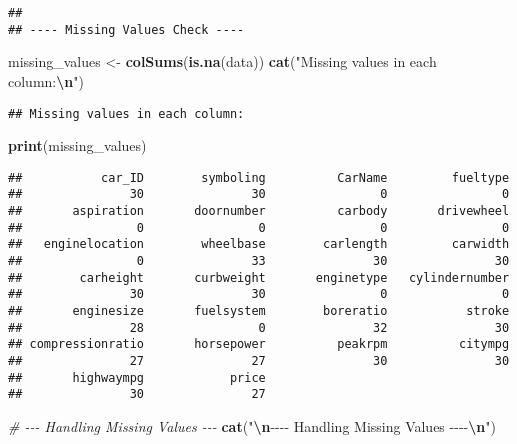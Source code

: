\documentclass[
]{article}
\newenvironment{Shaded}{\begin{snugshade}}{\end{snugshade}}
\newcommand{\CommentTok}[1]{\textcolor[rgb]{0.56,0.35,0.01}{\textit{#1}}}
\newcommand{\FunctionTok}[1]{\textcolor[rgb]{0.13,0.29,0.53}{\textbf{#1}}}
\newcommand{\NormalTok}[1]{#1}
\newcommand{\OtherTok}[1]{\textcolor[rgb]{0.56,0.35,0.01}{#1}}
\newcommand{\SpecialCharTok}[1]{\textcolor[rgb]{0.81,0.36,0.00}{\textbf{#1}}}
\newcommand{\StringTok}[1]{\textcolor[rgb]{0.31,0.60,0.02}{#1}}
\begin{document}
\begin{verbatim}
## 
## ---- Missing Values Check ----
\end{verbatim}

\begin{Shaded}
\begin{Highlighting}[]
\NormalTok{missing\_values }\OtherTok{\textless{}{-}} \FunctionTok{colSums}\NormalTok{(}\FunctionTok{is.na}\NormalTok{(data))}
\FunctionTok{cat}\NormalTok{(}\StringTok{"Missing values in each column:}\SpecialCharTok{\textbackslash{}n}\StringTok{"}\NormalTok{)}
\end{Highlighting}
\end{Shaded}

\begin{verbatim}
## Missing values in each column:
\end{verbatim}

\begin{Shaded}
\begin{Highlighting}[]
\FunctionTok{print}\NormalTok{(missing\_values)}
\end{Highlighting}
\end{Shaded}

\begin{verbatim}
##           car_ID        symboling          CarName         fueltype 
##               30               30                0                0 
##       aspiration       doornumber          carbody       drivewheel 
##                0                0                0                0 
##   enginelocation        wheelbase        carlength         carwidth 
##                0               33               30               30 
##        carheight       curbweight       enginetype   cylindernumber 
##               30               30                0                0 
##       enginesize       fuelsystem        boreratio           stroke 
##               28                0               32               30 
## compressionratio       horsepower          peakrpm          citympg 
##               27               27               30               30 
##       highwaympg            price 
##               30               27
\end{verbatim}

\begin{Shaded}
\begin{Highlighting}[]
\CommentTok{\# {-}{-}{-} Handling Missing Values {-}{-}{-}}
\FunctionTok{cat}\NormalTok{(}\StringTok{"}\SpecialCharTok{\textbackslash{}n}\StringTok{{-}{-}{-}{-} Handling Missing Values {-}{-}{-}{-}}\SpecialCharTok{\textbackslash{}n}\StringTok{"}\NormalTok{)}
\end{Highlighting}
\end{Shaded}
\end{document}
